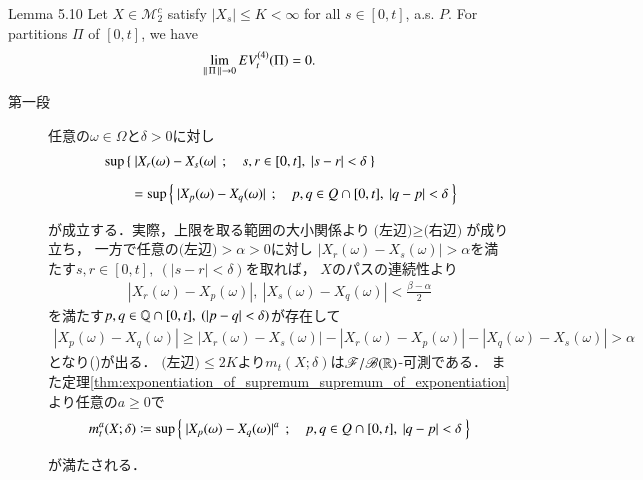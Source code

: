 	\begin{itembox}[l]{Lemma 5.10}
		Let $X \in \mathscr{M}_2^c$ satisfy $|X_s| \leq K < \infty$ for all $s \in [0,t]$, a.s. $P$.
		For partitions $\Pi$ of $[0,t]$, we have
		\begin{align}
			\lim_{\left\|\, \Pi\, \right\|_{} \to 0} E V_t^{(4)}(\Pi) = 0.
		\end{align}
	\end{itembox}
	
	\begin{prf}\mbox{}
		\begin{description}
			\item[第一段] 
				任意の$\omega \in \Omega$と$\delta > 0$に対し
				\begin{align}
					&\operatorname*{sup}_{} \left\{\ |X_r(\omega) - X_s(\omega|\ \, ; \quad s,r \in [0,t],\ |s-r| < \delta\ \right\} \\
					&\qquad = \operatorname*{sup}_{} \left\{\ |X_p(\omega) - X_q(\omega)|\ \, ; \quad p,q \in Q \cap [0,t],\ |q-p| < \delta\ \right\}
					\label{eq:chapter_1_lemma_5_10_1}
				\end{align}
				が成立する．実際，上限を取る範囲の大小関係より$\mbox{(左辺)} \geq \mbox{(右辺)}$が成り立ち，
				一方で任意の$\mbox{(左辺)} > \alpha > 0$に対し
				$|X_r(\omega) - X_s(\omega)| > \alpha$を満たす$s,r \in [0,t],\ (|s-r| < \delta)$を取れば，
				$X$のパスの連続性より
				\begin{align}
					|X_r(\omega) - X_p(\omega)|,\ |X_s(\omega) - X_q(\omega)| < \frac{\beta-\alpha}{2}
				\end{align}
				を満たす$p,q \in \mathbb{Q} \cap [0,t],\ (|p-q| < \delta)$が存在して
				\begin{align}
					|X_p(\omega) - X_q(\omega)| \geq |X_r(\omega) - X_s(\omega) | - |X_r(\omega) - X_p(\omega)| - |X_q(\omega) - X_s(\omega)| > \alpha
				\end{align}
				となり()が出る．
				$\mbox{(左辺)} \leq 2K$より$m_t(X;\delta)$は$\mathscr{F}/\mathscr{B}(\mathbb{R})$-可測である．
				また定理\ref{thm:exponentiation_of_supremum_supremum_of_exponentiation}より任意の$a \geq 0$で
				\begin{align}
					m_t^a(X;\delta) 
					\coloneqq \operatorname*{sup}_{} \left\{\ |X_p(\omega) - X_q(\omega)|^a\ \, ; \quad p,q \in Q \cap [0,t],\ |q-p| < \delta\ \right\}
				\end{align}
				が満たされる．
				

\end{description}
\end{prf}
